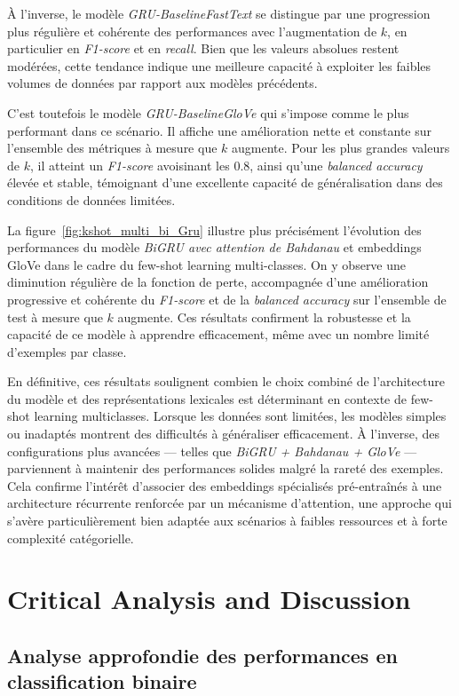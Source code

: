 \documentclass[12pt]{report}
\begin{document}
À l’inverse, le modèle \textit{GRU-BaselineFastText} se distingue par une progression plus régulière et cohérente des performances avec l’augmentation de $k$, en particulier en \textit{F1-score} et en \textit{recall}. Bien que les valeurs absolues restent modérées, cette tendance indique une meilleure capacité à exploiter les faibles volumes de données par rapport aux modèles précédents.

C’est toutefois le modèle \textit{GRU-BaselineGloVe} qui s’impose comme le plus performant dans ce scénario. Il affiche une amélioration nette et constante sur l’ensemble des métriques à mesure que $k$ augmente. Pour les plus grandes valeurs de $k$, il atteint un \textit{F1-score} avoisinant les 0.8, ainsi qu’une \textit{balanced accuracy} élevée et stable, témoignant d’une excellente capacité de généralisation dans des conditions de données limitées.

La figure~\ref{fig:kshot_multi_bi_Gru} illustre plus précisément l’évolution des performances du modèle \textit{BiGRU avec attention de Bahdanau} et embeddings GloVe dans le cadre du few-shot learning multi-classes. On y observe une diminution régulière de la fonction de perte, accompagnée d'une amélioration progressive et cohérente du \textit{F1-score} et de la \textit{balanced accuracy} sur l’ensemble de test à mesure que $k$ augmente. Ces résultats confirment la robustesse et la capacité de ce modèle à apprendre efficacement, même avec un nombre limité d’exemples par classe.

En définitive, ces résultats soulignent combien le choix combiné de l’architecture du modèle et des représentations lexicales est déterminant en contexte de few-shot learning multiclasses. Lorsque les données sont limitées, les modèles simples ou inadaptés montrent des difficultés à généraliser efficacement. À l’inverse, des configurations plus avancées — telles que \textit{BiGRU + Bahdanau + GloVe} — parviennent à maintenir des performances solides malgré la rareté des exemples. Cela confirme l’intérêt d’associer des embeddings spécialisés pré-entraînés à une architecture récurrente renforcée par un mécanisme d’attention, une approche qui s’avère particulièrement bien adaptée aux scénarios à faibles ressources et à forte complexité catégorielle.

\section{Critical Analysis and Discussion}

\subsection{Analyse approfondie des performances en classification binaire}
\end{document}

